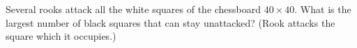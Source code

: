\problem
Several rooks attack all the white squares of the chessboard $40 \times 40$. 
What is the largest number of black squares that can stay unattacked? 
(Rook attacks the square which it occupies.)
\solution
\endproblem
